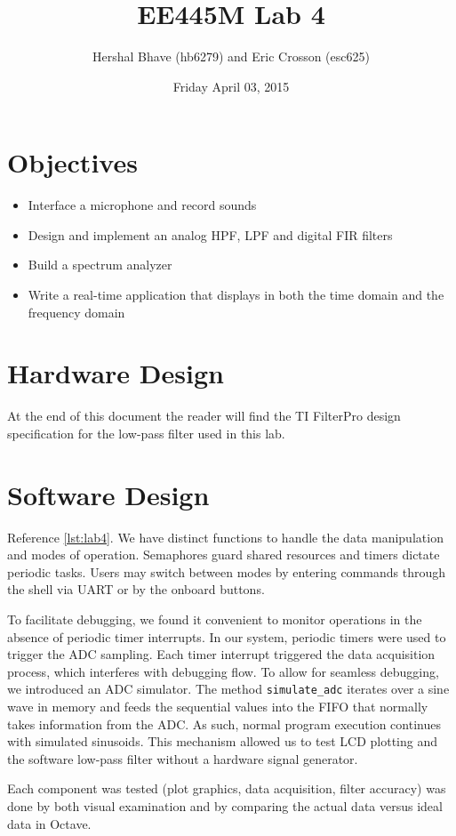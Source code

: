 \documentclass[12pt]{article}
\title{EE445M Lab 4}
\author{Hershal Bhave (hb6279) and Eric Crosson (esc625)}
\date{Friday April 03, 2015}
\begin{document}
\maketitle

\section{Objectives}
\begin{itemize}
\item Interface a microphone and record sounds
\item Design and implement an analog HPF, LPF and digital FIR filters
\item Build a spectrum analyzer
\item Write a real-time application that displays in both the time
  domain and the frequency domain
\end{itemize}

\section{Hardware Design}
At the end of this document the reader will find the TI FilterPro
design specification for the low-pass filter used in this lab.

\section{Software Design}
Reference \cref{lst:lab4}. We have distinct functions to handle the
data manipulation and modes of operation. Semaphores guard shared
resources and timers dictate periodic tasks. Users may switch between
modes by entering commands through the shell via UART or by the
onboard buttons.

To facilitate debugging, we found it convenient to monitor operations
in the absence of periodic timer interrupts. In our system, periodic
timers were used to trigger the ADC sampling. Each timer interrupt
triggered the data acquisition process, which interferes with
debugging flow. To allow for seamless debugging, we introduced an ADC
simulator. The method \verb|simulate_adc| iterates over a sine wave in
memory and feeds the sequential values into the FIFO that normally
takes information from the ADC. As such, normal program execution
continues with simulated sinusoids. This mechanism allowed us to test
LCD plotting and the software low-pass filter without a hardware
signal generator.

Each component was tested (plot graphics, data acquisition, filter
accuracy) was done by both visual examination and by comparing the
actual data versus ideal data in Octave.
\end{document}
